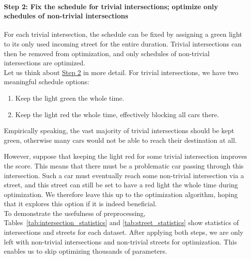 \paragraph{Step 2: Fix the schedule for trivial intersections; optimize only schedules of non-trivial intersections} \label{para:step_2}
For each trivial intersection, the schedule can be fixed by assigning a green light to its only used incoming street for the entire duration. Trivial intersections can then be removed from optimization, and only schedules of non-trivial intersections are optimized. \\

Let us think about \hyperref[para:step_2]{Step 2} in more detail. For trivial intersections, we have two meaningful schedule options:
\begin{enumerate}
    \item Keep the light green the whole time.
    \item Keep the light red the whole time, effectively blocking all cars there.
\end{enumerate}
Empirically speaking, the vast majority of trivial intersections should be kept green, otherwise many cars would not be able to reach their destination at all.

However, suppose that keeping the light red for some trivial intersection improves the score. This means that there must be a problematic car passing through this intersection. Such a car must eventually reach some non-trivial intersection via a street, and this street can still be set to have a red light the whole time during optimization. We therefore leave this up to the optimization algorithm, hoping that it explores this option if it is indeed beneficial. \\

To demonstrate the usefulness of preprocessing, Tables~\ref{tab:intersection_statistics} and \ref{tab:street_statistics} show statistics of intersections and streets for each dataset. After applying both steps, we are only left with non-trivial intersections and non-trivial streets for optimization. This enables us to skip optimizing thousands of parameters.

